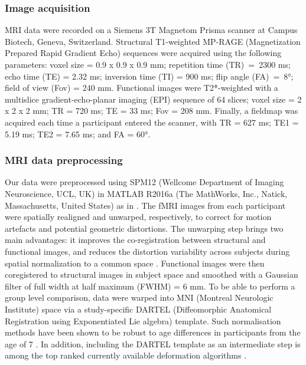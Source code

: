 \subsubsection{Image acquisition} 
MRI data were recorded on a Siemens 3T Magnetom Prisma scanner at Campus Biotech, Geneva, Switzerland. Structural T1-weighted MP-RAGE (Magnetization Prepared Rapid Gradient Echo) sequences were acquired using the following parameters: voxel size = 0.9 x 0.9 x 0.9 mm; repetition time (TR)~=~2300 ms; echo time (TE) = 2.32 ms; inversion time (TI) = 900 ms; flip angle (FA)~=~8°; field of view (Fov) = 240 mm. Functional images were T2*-weighted with a multislice gradient-echo-planar imaging (EPI) sequence of 64 slices; voxel size = 2 x 2 x 2 mm; TR = 720 ms; TE = 33 ms; Fov = 208 mm. Finally, a fieldmap was acquired each time a participant entered the scanner, with TR = 627 ms; TE1 = 5.19 ms; TE2 = 7.65 ms; and FA = 60°.


\subsubsection{MRI data preprocessing} 
Our data were preprocessed using SPM12 (Wellcome Department of Imaging Neuroscience, UCL, UK) in MATLAB R2016a (The MathWorks, Inc., Natick, Massachusetts, United States) as in \citet{Liverani2020}. The fMRI images from each participant were spatially realigned and unwarped, respectively, to correct for motion artefacts and potential geometric distortions. The unwarping step brings two main advantages: it improves the co-registration between structural and functional images, and reduces the distortion variability across subjects during spatial normalization to a common space \citep{Hutton2002}. Functional images were then coregistered to structural images in subject space and smoothed with a Gaussian filter of full width at half maximum (FWHM) = 6 mm. To be able to perform a group level comparison, data were warped into MNI (Montreal Neurologic Institute) space via a study-specific DARTEL (Diffeomorphic Anatomical Registration using Exponentiated Lie algebra) template. Such normalisation methods have been shown to be robust to age differences in participants from the age of 7 \citep{ASHBURNER1998, Burgund2002}. In addition, including the DARTEL template as an intermediate step is among the top ranked currently available deformation algorithms \citep{Klein2009}.  


